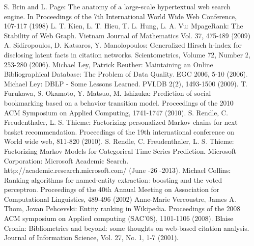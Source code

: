 \documentclass[lnicst]{svmultln}
\begin{document}
%
%
\begin{thebibliography}{5}

 S. Brin and L. Page: The anatomy of a
large-scale hypertextual web search engine.  In
Proceedings of the 7th International World Wide Web
Conference, 107-117 (1998)
 L. T. Kien, L. T. Hieu, T. L. Hung, L. A. Vu: MpageRank: The Stability of Web Graph.
Vietnam Journal of Mathematics Vol. 37, 475-489 (2009)
 A. Sidiropoulos, D. Katsaros, Y. Manolopoulos: Generalized Hirsch h-index for disclosing latent facts in citation networks. Scientometrics, Volume 72, Number 2, 253-280 (2006).
 Michael Ley, Patrick Reuther: Maintaining an Online Bibliographical Database: The Problem of Data Quality. EGC 2006, 5-10 (2006).
 Michael Ley: DBLP - Some Lessons Learned. PVLDB 2(2), 1493-1500 (2009).
 T. Furukawa, S. Okamoto, Y. Matsuo, M. Ishizuka: Prediction of social bookmarking based on a behavior transition model. Proceedings of the 2010 ACM Symposium on Applied Computing, 1741-1747  (2010).
 S. Rendle, C. Freudenthaler, L. S. Thieme: Factorizing personalized Markov chains for next-basket recommendation. Proceedings of the 19th international conference on World wide web, 811-820 (2010).
 S. Rendle, C. Freudenthaler, L. S. Thieme: Factorizing Markov Models for Categorical Time Series Prediction.
 Microsoft  Corporation: Microsoft Academic Search. http://academic.research.microsoft.com/ (June -26 -2013).
Michael Collins: Ranking algorithms for named-entity extraction: boosting and the voted perceptron. Proceedings of the 40th Annual Meeting on Association for Computational Linguistics, 489-496 (2002)
Anne-Marie Vercoustre, James A. Thom, Jovan Pehcevski: Entity ranking in Wikipedia. 
Proceedings of the 2008 ACM symposium on Applied computing (SAC'08),
1101-1106 (2008).
Blaise Cronin:
Bibliometrics and beyond: some thoughts on web-based citation analysis. Journal of Information Science,
Vol. 27, No. 1, 1-7 (2001).

\end{thebibliography}
%
\end{document}
